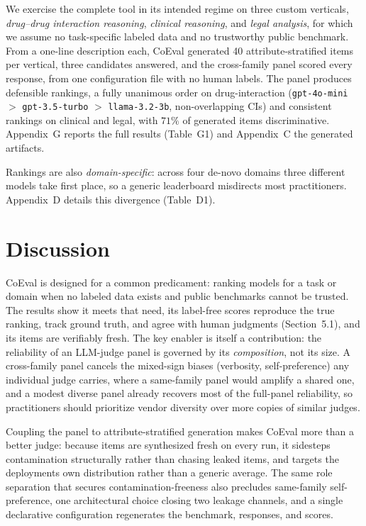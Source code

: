 \documentclass[11pt,a4paper]{article}
\begin{document}
We exercise the complete tool in its intended regime on three custom verticals,
\emph{drug--drug interaction reasoning}, \emph{clinical reasoning}, and \emph{legal analysis}, for
which we assume no task-specific labeled data and no trustworthy public benchmark. From a one-line description
each, CoEval generated 40 attribute-stratified items per vertical, three candidates answered, and the
cross-family panel scored every response, from one configuration file with no human labels. The panel produces
defensible rankings, a fully unanimous order on drug-interaction (\texttt{gpt-4o-mini} \(>\)
\texttt{gpt-3.5-turbo} \(>\) \texttt{llama-3.2-3b}, non-overlapping CIs) and consistent rankings on clinical
and legal, with \(71\%\) of generated items discriminative. Appendix~G reports the full results
(Table~G1) and Appendix~C the generated artifacts.

Rankings are also \emph{domain-specific}: across four de-novo domains three different models take first place,
so a generic leaderboard misdirects most practitioners. Appendix~D details this divergence (Table~D1).

\section{Discussion}\label{discussion}

CoEval is designed for a common predicament: ranking models for a task or domain when no labeled data exists and public
benchmarks cannot be trusted. The results show it meets that need, its label-free scores reproduce the true ranking,
track ground truth, and agree with human judgments (Section~5.1), and its items are verifiably fresh. The key
enabler is itself a contribution: the reliability of an LLM-judge panel is governed by its \emph{composition}, not its
size. A cross-family panel cancels the mixed-sign biases (verbosity, self-preference) any individual judge carries,
where a same-family panel would amplify a shared one, and a modest diverse panel already recovers most of the
full-panel reliability, so practitioners should prioritize vendor diversity over more copies of similar judges.

Coupling the panel to attribute-stratified generation makes CoEval more than a better judge: because items are
synthesized fresh on every run, it sidesteps contamination structurally rather than chasing leaked items, and targets
the deployment\textquotesingle s own distribution rather than a generic average. The same role separation that secures
contamination-freeness also precludes same-family self-preference, one architectural choice closing two leakage
channels, and a single declarative configuration regenerates the benchmark, responses, and scores.
\end{document}
